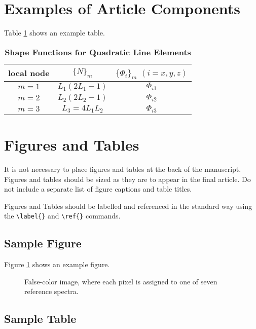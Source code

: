 \documentclass[9pt,twocolumn,twoside]{optica}
\begin{document}
\section{Examples of Article Components}


\label{sec:examples}



Table \ref{tab:shape-functions} shows an example table. 

\begin{table}[htbp]
\centering
\caption{\bf Shape Functions for Quadratic Line Elements}
\begin{tabular}{ccc}
\hline
local node & $\{N\}_m$ & $\{\Phi_i\}_m$ $(i=x,y,z)$ \\
\hline
$m = 1$ & $L_1(2L_1-1)$ & $\Phi_{i1}$ \\
$m = 2$ & $L_2(2L_2-1)$ & $\Phi_{i2}$ \\
$m = 3$ & $L_3=4L_1L_2$ & $\Phi_{i3}$ \\
\hline
\end{tabular}
  \label{tab:shape-functions}
\end{table}


\section{Figures and Tables}

It is not necessary to place figures and tables at the back of the manuscript. Figures and tables should be sized as they are to appear in the final article. Do not include a separate list of figure captions and table titles.

Figures and Tables should be labelled and referenced in the standard way using the \verb|\label{}| and \verb|\ref{}| commands.

\subsection{Sample Figure}

Figure \ref{fig:false-color} shows an example figure.

\begin{figure}[htbp]
\centering
{}
\caption{False-color image, where each pixel is assigned to one of seven reference spectra.}
\label{fig:false-color}
\end{figure}

\subsection{Sample Table}
\end{document}
